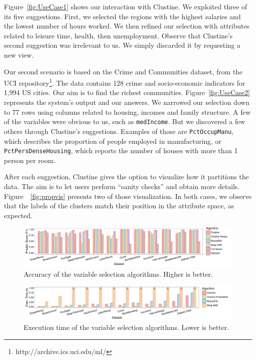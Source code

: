 Figure~\ref{fig:UseCase1} shows our interaction with Clustine. We exploited
three of its five suggestions. First, we selected the regions with the highest
salaries and the lowest number of hours worked.  We then refined our selection
with attributes related to leisure time, health, then unemployment. Observe
that Clustine's second suggestion was irrelevant to us. We simply discarded it by
requesting a new view.

Our second scenario is based on the Crime and Communities dataset, from the UCI
repository\footnote{http://archive.ics.uci.edu/ml/}. The data contains 128
crime and socio-economic indicators for 1,994 US cities. Our aim is to find the
richest communities. Figure~\ref{fig:UseCase2} represents the system's output
and our answers. We narrowed our selection down to 77 rows using columns
related to housing, incomes and family structure. A few of the variables were
obvious to us, such as \texttt{medIncome}. But we discovered a few others
through Clustine's suggestions. Examples of those are \texttt{PctOccupManu},
which describes the proportion of people employed in manufacturing, or
\texttt{PctPersDenseHousing}, which reports the number of houses with more than
1 person per room.

After each suggestion, Clustine gives the option to visualize how it partitions
the data. The aim is to let users perform ``sanity checks'' and obtain more
details.  Figure~~\ref{fig:propvis} presents two of those visualization. In
both cases, we observe that the labels of the clusters match their position in
the attribute space, as expected.


\begin{figure}[t]
  \centering
  \includegraphics[width=\textwidth]{Experiments/F1_Scores}
  \caption{Accuracy of the variable selection algorithms. Higher is better.}\label{pic:accuracy}
\end{figure}
\begin{figure}[t]
  \centering
  \includegraphics[width=\textwidth]{Experiments/Timings}
  \caption{Execution time of the variable selection algorithms. Lower is
  better.}
  \label{pic:runtime}
\end{figure}

